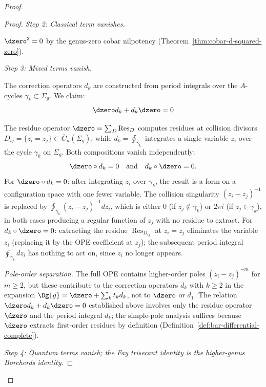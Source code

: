\begin{proof}
\begin{proof}
\emph{Step 2: Classical term vanishes.}

$\dzero^2 = 0$ by the genus-zero cobar nilpotency (Theorem~\ref{thm:cobar-d-squared-zero}).

\emph{Step 3: Mixed terms vanish.}

The correction operators $d_k$ are constructed from period integrals over the $A$-cycles $\gamma_k \subset \Sigma_g$. We claim:
\[\dzero d_k + d_k \dzero = 0\]

The residue operator $\dzero = \sum_D \operatorname{Res}_D$ computes residues at collision divisors $D_{ij} = \{z_i = z_j\} \subset \overline{C}_n(\Sigma_g)$, while $d_k = \oint_{\gamma_k}$ integrates a single variable $z_i$ over the cycle $\gamma_k$ on $\Sigma_g$. Both compositions vanish independently:
\[
\dzero \circ d_k = 0 \quad \text{and} \quad d_k \circ \dzero = 0.
\]
For $\dzero \circ d_k = 0$: after integrating $z_i$ over $\gamma_k$, the result is a form on a configuration space with one fewer variable. The collision singularity $(z_i - z_j)^{-1}$ is replaced by $\oint_{\gamma_k} (z_i - z_j)^{-1} dz_i$, which is either $0$ (if $z_j \notin \gamma_k$) or $2\pi i$ (if $z_j \in \gamma_k$), in both cases producing a regular function of $z_j$ with no residue to extract. For $d_k \circ \dzero = 0$: extracting the residue $\operatorname{Res}_{D_{ij}}$ at $z_i = z_j$ eliminates the variable $z_i$ (replacing it by the OPE coefficient at $z_j$); the subsequent period integral $\oint_{\gamma_k} dz_i$ has nothing to act on, since $z_i$ no longer appears.

\emph{Pole-order separation.} The full OPE contains higher-order poles $(z_i - z_j)^{-m}$ for $m \geq 2$, but these contribute to the correction operators $d_k$ with $k \geq 2$ in the expansion $\Dg{g} = \dzero + \sum_k t_k d_k$, not to $\dzero$ or $d_1$. The relation $\dzero d_k + d_k \dzero = 0$ established above involves only the residue operator $\dzero$ and the period integral $d_k$; the simple-pole analysis suffices because $\dzero$ extracts first-order residues by definition (Definition~\ref{def:bar-differential-complete}).

\emph{Step 4: Quantum terms vanish; the Fay trisecant identity
is the higher-genus Borcherds identity.}


\end{proof}
\end{proof}
